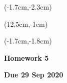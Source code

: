 \documentclass[12pt, oneside]{article}
\begin{document}
\begin{textblock*}{4cm}(-1.7cm,-2.3cm)
\end{textblock*}

\begin{textblock*}{8cm}(12.5cm,-1cm)
\end{textblock*}
\begin{textblock*}{13.5cm}(-1.7cm,-1.8cm)
\end{textblock*}

\vspace{1cm}

\begin{center}
\textbf{\Large Homework 5}

\textbf{Due 29 Sep 2020}
\end{center}
\end{document}

